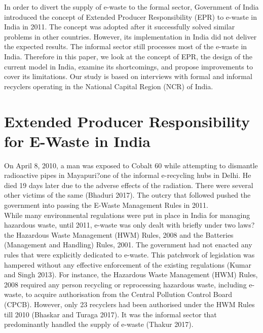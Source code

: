 \documentclass[a4paper, 12pt]{article}
\begin{document}
                    In order to divert the supply of e-waste to the formal sector, Government of India introduced the concept of Extended Producer Responsibility (EPR) to e-waste in India in 2011. The concept was adopted after it successfully solved similar problems in other countries. However, its implementation in India did not deliver the expected results. The informal sector still processes most of the e-waste in India. Therefore in this paper, we look at the concept of EPR, the design of the current model in India, examine its shortcomings, and propose improvements to cover its limitations. Our study is based on interviews with formal and informal recyclers operating in the National Capital Region (NCR) of India. 
                    
                    \section{Extended Producer Responsibility for E-Waste in India}
                    
                    On April 8, 2010, a man was exposed to Cobalt 60 while attempting to dismantle radioactive pipes in Mayapuri?one of the informal e-recycling hubs in Delhi. He died 19 days later due to the adverse effects of the radiation. There were several other victims of the same (Bhaduri 2017). The outcry that followed pushed the government into passing the E-Waste Management Rules in 2011. \\
                    
                    While many environmental regulations were put in place in India for managing hazardous waste, until 2011, e-waste was only dealt with briefly under two laws?the Hazardous Waste Management (HWM) Rules, 2008 and the Batteries (Management and Handling) Rules, 2001. The government had not enacted any rules that were explicitly dedicated to e-waste. This patchwork of legislation was hampered without any effective enforcement of the existing regulations (Kumar and Singh 2013). For instance, the Hazardous Waste Management (HWM) Rules, 2008 required any person recycling or reprocessing hazardous waste, including e-waste, to acquire authorisation from the Central Pollution Control Board (CPCB). However, only 23 recyclers had been authorised under the HWM Rules till 2010 (Bhaskar and Turaga 2017). It was the informal sector that predominantly handled the supply of e-waste (Thakur 2017). \\
                    
\end{document}
